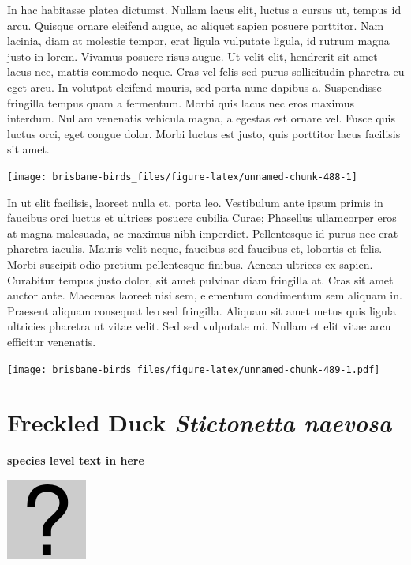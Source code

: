 \documentclass[]{book}
\let\origfigure\figure
\let\endorigfigure\endfigure
\renewenvironment{figure}[1][2] {
  \expandafter\origfigure\expandafter[H]
} {
  \endorigfigure
}
\begin{document}
In hac habitasse platea dictumst. Nullam lacus elit, luctus a cursus ut,
tempus id arcu. Quisque ornare eleifend augue, ac aliquet sapien posuere
porttitor. Nam lacinia, diam at molestie tempor, erat ligula vulputate
ligula, id rutrum magna justo in lorem. Vivamus posuere risus augue. Ut
velit elit, hendrerit sit amet lacus nec, mattis commodo neque. Cras vel
felis sed purus sollicitudin pharetra eu eget arcu. In volutpat eleifend
mauris, sed porta nunc dapibus a. Suspendisse fringilla tempus quam a
fermentum. Morbi quis lacus nec eros maximus interdum. Nullam venenatis
vehicula magna, a egestas est ornare vel. Fusce quis luctus orci, eget
congue dolor. Morbi luctus est justo, quis porttitor lacus facilisis sit
amet.

\begin{figure}
\texttt{[image: brisbane-birds\_files/figure-latex/unnamed-chunk-488-1]} \caption{insert figure caption}\label{fig:unnamed-chunk-488}
\end{figure}

In ut elit facilisis, laoreet nulla et, porta leo. Vestibulum ante ipsum
primis in faucibus orci luctus et ultrices posuere cubilia Curae;
Phasellus ullamcorper eros at magna malesuada, ac maximus nibh
imperdiet. Pellentesque id purus nec erat pharetra iaculis. Mauris velit
neque, faucibus sed faucibus et, lobortis et felis. Morbi suscipit odio
pretium pellentesque finibus. Aenean ultrices ex sapien. Curabitur
tempus justo dolor, sit amet pulvinar diam fringilla at. Cras sit amet
auctor ante. Maecenas laoreet nisi sem, elementum condimentum sem
aliquam in. Praesent aliquam consequat leo sed fringilla. Aliquam sit
amet metus quis ligula ultricies pharetra ut vitae velit. Sed sed
vulputate mi. Nullam et elit vitae arcu efficitur venenatis.

\begin{figure}
\centering
\texttt{[image: brisbane-birds\_files/figure-latex/unnamed-chunk-489-1.pdf]}
\caption{\label{fig:unnamed-chunk-489}insert figure caption}
\end{figure}

\section{\texorpdfstring{Freckled Duck \emph{Stictonetta
naevosa}}{Freckled Duck Stictonetta naevosa}}\label{freckled-duck-stictonetta-naevosa}

\textbf{species level text in here}

\begin{figure}
\centering
\includegraphics{assets/missing.png}
\caption{No image for species}
\end{figure}
\end{document}
